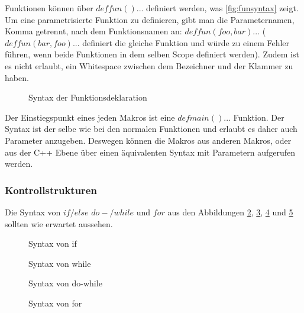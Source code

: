       Funktionen können über \myMIn$def fun(){...}$ definiert werden, was \autoref{fig:funsyntax} zeigt. Um eine parametrisierte Funktion zu definieren, gibt man die Parameternamen, Komma getrennt, nach dem Funktionsnamen an: \myMIn$def fun(foo, bar){...}$ (\myMIn$def fun(bar, foo){...}$ definiert die gleiche Funktion und würde zu einem Fehler führen, wenn beide Funktionen in dem selben Scope definiert werden). Zudem ist es nicht erlaubt, ein Whitespace zwischen dem Bezeichner und der Klammer zu haben.
      \begin{figure}[H]
        \centering
        \caption{Syntax der Funktionsdeklaration}
        \label{fig:funsyntax}
      \end{figure}
      Der Einstiegspunkt eines jeden Makros ist eine \myMIn$def main(){...}$ Funktion. Der Syntax ist der selbe wie bei den normalen Funktionen und erlaubt es daher auch Parameter anzugeben. Deswegen können die Makros aus anderen Makros, oder aus der C++ Ebene über einen äquivalenten Syntax mit Parametern aufgerufen werden.

    \subsubsection{Kontrollstrukturen}
    \label{sssec:Kontrollstrukturen}
      Die Syntax von \myMIn$if/else$ \myMIn$do-/while$ und \myMIn$for$ aus den Abbildungen \ref{fig:ifsyntax}, \ref{fig:whilesyntax}, \ref{fig:dowhilesyntax} und \ref{fig:forsyntax} sollten wie erwartet aussehen.
      \begin{figure}[H]
        \centering
        \caption{Syntax von if}
        \label{fig:ifsyntax}
      \end{figure}

      \begin{figure}[H]
        \centering
        \caption{Syntax von while}
        \label{fig:whilesyntax}
      \end{figure}

      \begin{figure}[H]
        \centering
        \caption{Syntax von do-while}
        \label{fig:dowhilesyntax}
      \end{figure}

      \begin{figure}[H]
        \centering
        \caption{Syntax von for}
        \label{fig:forsyntax}
      \end{figure}

